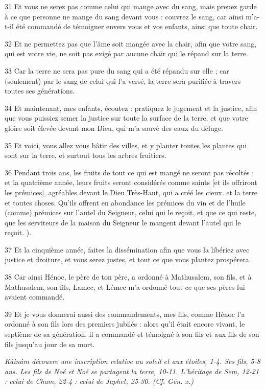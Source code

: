 \par 31 Et vous ne serez pas comme celui qui mange avec du sang, mais prenez garde à ce que personne ne mange du sang devant vous : couvrez le sang, car ainsi m'a-t-il été commandé de témoigner envers vous et vos enfants, ainsi que toute chair.
\par 32 Et ne permettez pas que l'âme soit mangée avec la chair, afin que votre sang, qui est votre vie, ne soit pas exigé par aucune chair qui le répand sur la terre.
\par 33 Car la terre ne sera pas pure du sang qui a été répandu sur elle ; car (seulement) par le sang de celui qui l'a versé, la terre sera purifiée à travers toutes ses générations.
\par 34 Et maintenant, mes enfants, écoutez : pratiquez le jugement et la justice, afin que vous puissiez semer la justice sur toute la surface de la terre, et que votre gloire soit élevée devant mon Dieu, qui m'a sauvé des eaux du déluge.
\par 35 Et voici, vous allez vous bâtir des villes, et y planter toutes les plantes qui sont sur la terre, et surtout tous les arbres fruitiers.
\par 36 Pendant trois ans, les fruits de tout ce qui est mangé ne seront pas récoltés ; et la quatrième année, leurs fruits seront considérés comme saints [et ils offriront les prémices], agréables devant le Dieu Très-Haut, qui a créé les cieux. et la terre et toutes choses. Qu'ils offrent en abondance les prémices du vin et de l'huile (comme) prémices sur l'autel du Seigneur, celui qui le reçoit, et que ce qui reste, que les serviteurs de la maison du Seigneur le mangent devant l'autel qui le reçoit. ).
\par 37 Et la cinquième année, faites la dissémination afin que vous la libériez avec justice et droiture, et vous serez justes, et tout ce que vous plantez prospérera.
\par 38 Car ainsi Hénoc, le père de ton père, a ordonné à Mathusalem, son fils, et à Mathusalem, son fils, Lamec, et Lémec m'a ordonné tout ce que ses pères lui avaient commandé.
\par 39 Et je vous donnerai aussi des commandements, mes fils, comme Hénoc l'a ordonné à son fils lors des premiers jubilés : alors qu'il était encore vivant, le septième de sa génération, il a commandé et témoigné à son fils et aux fils de son fils jusqu'au jour de sa mort.


\par \textit{Kâinâm découvre une inscription relative au soleil et aux étoiles, 1-4. Ses fils, 5-8 ans. Les fils de Noé et Noé se partagent la terre, 10-11. L'héritage de Sem, 12-21 : celui de Cham, 22-4 : celui de Japhet, 25-30. (Cf. Gén. x.)}


